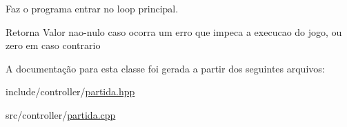 Faz o programa entrar no loop principal. 

\begin{DoxyReturn}{Retorna}
Valor nao-\/nulo caso ocorra um erro que impeca a execucao do jogo, ou zero em caso contrario 
\end{DoxyReturn}


A documentação para esta classe foi gerada a partir dos seguintes arquivos:\begin{DoxyCompactItemize}
\item 
include/controller/\hyperlink{partida_8hpp}{partida.hpp}\item 
src/controller/\hyperlink{partida_8cpp}{partida.cpp}\end{DoxyCompactItemize}
